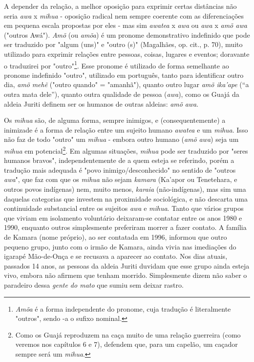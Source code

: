 A depender da relação, a melhor oposição para exprimir certas distâncias
não seria \emph{awa} x \emph{mihua} - oposição radical nem sempre
coerente com as diferenciações em pequena escala propostas por eles -
mas sim \emph{awatea} x \emph{awa} ou \emph{awa} x \emph{amõ awa}
("outros Awá"). \emph{Amõ} (ou \emph{amõa}) é um pronome demonstrativo
indefinido que pode ser traduzido por "algum (uns)" e "outro (s)"
(Magalhães, op. cit., p. 70), muito utilizado para exprimir relações
entre pessoas, coisas, lugares e eventos; doravante o traduzirei por
"outro"\footnote{\emph{Amõa} é a forma independente do pronome, cuja
  tradução é literalmente "outros", sendo -a o sufixo nominal.}. Esse
pronome é utilizado de forma semelhante ao pronome indefinido "outro",
utilizado em português, tanto para identificar outro dia, \emph{amõ}
\emph{mehẽ} ("outro quando" = "amanhã"), quanto outro lugar \emph{amõ
ika'ape} (``a outra mata dele''), quanto outra qualidade de pessoa
(\emph{awa}), como os Guajá da aldeia Juriti definem ser os humanos de
outras aldeias: \emph{amõ} \emph{awa}.

Os \emph{mihua} são, de alguma forma, sempre inimigos, e
(consequentemente) a inimizade é a forma de relação entre um sujeito
humano \emph{awatea} e um \emph{mihua}. Isso não faz de todo "outro" um
\emph{mihua} - embora outro humano (\emph{amõ} \emph{awa}) seja um
\emph{mihua} em potencial\footnote{Como os Guajá reproduzem na caça
  muito de uma relação guerreira (como veremos nos capítulos 6 e 7),
  defendem que, para um capelão, um caçador sempre será um \emph{mihua}.}.
Em algumas situações, \emph{mihua} pode ser traduzido por "seres humanos
bravos", independentemente de a quem esteja se referindo, porém a
tradução mais adequada é "povo inimigo/desconhecido" no sentido de
"outros \emph{awa}", que faz com que os \emph{mihua} não sejam
\emph{kamara} (Ka'apor ou Tenetehara, e outros povos indígenas) nem,
muito menos, \emph{karaia} (não-indígenas), mas sim uma daquelas
categorias que investem na proximidade sociológica, e não descarta uma
continuidade substancial entre os sujeitos \emph{awa} e \emph{mihua}.
Tanto que vários grupos que viviam em isolamento voluntário deixaram-se
contatar entre os anos 1980 e 1990, enquanto outros simplesmente
preferiram morrer a fazer contato. A família de Kamara (nome próprio),
ao ser contatada em 1996, informou que outro pequeno grupo, junto com o
irmão de Kamara, ainda vivia nas imediações do igarapé Mão-de-Onça e se
recusava a aparecer ao contato. Nos dias atuais, passados 14 anos, as
pessoas da aldeia Juriti duvidam que esse grupo ainda esteja vivo,
embora não afirmem que tenham morrido. Simplesmente dizem não saber o
paradeiro dessa \emph{gente do mato} que sumiu sem deixar rastro.

